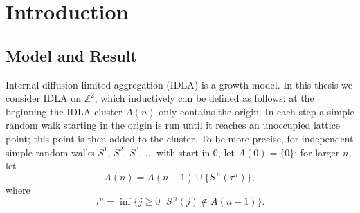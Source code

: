 \documentclass[11pt]{article}
\numberwithin{equation}{section}
\begin{document}
\tableofcontents
{}

\newpage
\clearpage
{} 

\section{Introduction}
\subsection{Model and Result}
Internal diffusion limited aggregation (IDLA) is a growth model.  
In this thesis we consider IDLA on $\mathbb{Z}^2$, which
inductively can be defined as follows:
at the beginning the IDLA cluster $A(n)$ only contains the origin. 
In each step a simple random walk starting in the 
origin is run until it reaches an unoccupied lattice point; 
this point is then added to the cluster. To be more precise, 
for independent simple random walks 
$S^1$, $S^2$, $S^3$, ... 
with start in $0$, let $A(0) = \{0\}$; for larger $n$, let 
\begin{equation}\nonumber
  A(n) = A(n-1) \cup \{S^{\,n}(\tau^n)\},
\end{equation}
where 
\begin{equation}\nonumber
  \tau^n = \inf \{ j \geq 0 \,|\, S^{\,n}(j) \notin A(n-1) \}.
\end{equation} 
\end{document}
